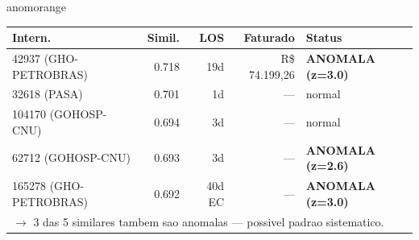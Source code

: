 \documentclass[a4paper,10pt]{article}
\begin{document}
\begin{anomalycard}[Internacao 167107 | GHO-PETROBRAS | ALTO (z=3.56)]{anomorange}
\begin{tabular}{l r r r l}\toprule\textbf{Intern.} & \textbf{Simil.} & \textbf{LOS} & \textbf{Faturado} & \textbf{Status} \\\midrule
42937 (GHO-PETROBRAS) & 0.718 & 19d & R\$ 74.199,26 & \textcolor{anomred}{\textbf{ANOMALA (z=3.0)}} \\
32618 (PASA) & 0.701 & 1d & --- & \textcolor{jcubeblue}{normal} \\
104170 (GOHOSP-CNU) & 0.694 & 3d & --- & \textcolor{jcubeblue}{normal} \\
62712 (GOHOSP-CNU) & 0.693 & 3d & --- & \textcolor{anomred}{\textbf{ANOMALA (z=2.6)}} \\
165278 (GHO-PETROBRAS) & 0.692 & 40d EC & --- & \textcolor{anomred}{\textbf{ANOMALA (z=3.0)}} \\
\multicolumn{5}{l}{\textcolor{anomred}{\small $\rightarrow$ 3 das 5 similares tambem sao anomalas --- possivel padrao sistematico.}} \\
\bottomrule\end{tabular}


\end{anomalycard}

\newpage
\end{document}
